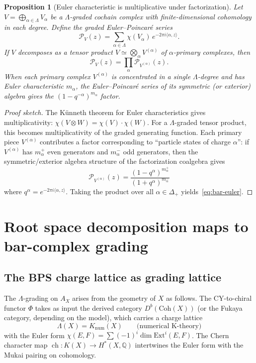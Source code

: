 \documentclass[11pt]{article}
\newtheorem{proposition}[theorem]{Proposition}
\theoremstyle{definition}
\theoremstyle{remark}
\DeclareMathOperator{\ch}{ch}
\begin{document}
\begin{proposition}[Euler characteristic is multiplicative under factorization]
\label{prop:euler-multiplicative}
Let $V = \bigoplus_{\alpha \in \Lambda} V_\alpha$ be a $\Lambda$-graded
cochain complex with finite-dimensional cohomology in each degree. Define
the \emph{graded Euler--Poincar\'e series}
\[
 \mathcal{P}_V(z) = \sum_{\alpha \in \Lambda} \chi(V_\alpha)\, e^{-2\pi i\langle\alpha,z\rangle}.
\]
If $V$ decomposes as a tensor product $V \simeq \bigotimes_{\alpha} V^{(\alpha)}$
of $\alpha$-primary complexes, then
\[
 \mathcal{P}_V(z) = \prod_{\alpha} \mathcal{P}_{V^{(\alpha)}}(z).
\]
When each primary complex $V^{(\alpha)}$ is concentrated in a single
$\Lambda$-degree and has Euler characteristic $m_\alpha$, the
Euler--Poincar\'e series of its symmetric (or exterior) algebra gives
the $(1 - q^{-\alpha})^{m_\alpha}$ factor.
\end{proposition}

\begin{proof}[Proof sketch]
The K\"unneth theorem for Euler characteristics gives multiplicativity:
$\chi(V \otimes W) = \chi(V) \cdot \chi(W)$. For a $\Lambda$-graded
tensor product, this becomes multiplicativity of the graded generating
function. Each primary piece $V^{(\alpha)}$ contributes a factor
corresponding to ``particle states of charge $\alpha$'': if $V^{(\alpha)}$
has $m_\alpha^+$ even generators and $m_\alpha^-$ odd generators, then
the symmetric/exterior algebra structure of the factorization coalgebra
gives
\[
 \mathcal{P}_{V^{(\alpha)}}(z)
 = \frac{(1 - q^\alpha)^{m_\alpha^+}}{(1 + q^\alpha)^{m_\alpha^-}}
\]
where $q^\alpha = e^{-2\pi i\langle\alpha,z\rangle}$. Taking the product
over all $\alpha \in \Delta_+$ yields~\eqref{eq:bar-euler}.
\end{proof}


\section{Root space decomposition maps to bar-complex grading}
\label{sec:root-bar-grading}

\subsection{The BPS charge lattice as grading lattice}

The $\Lambda$-grading on $A_X$ arises from the geometry of $X$ as
follows. The CY-to-chiral functor $\Phi$ takes as input the derived
category $D^b(\mathrm{Coh}(X))$ (or the Fukaya category, depending on
the model), which carries a charge lattice
\[
 \Lambda(X) = K_{\mathrm{num}}(X)
 \qquad\text{(numerical K-theory)}
\]
with the Euler form $\chi(E,F) = \sum (-1)^i \dim \mathrm{Ext}^i(E,F)$.
The Chern character map $\ch \colon K(X) \to H^*(X,\mathbb{Q})$ intertwines
the Euler form with the Mukai pairing on cohomology.
\end{document}
